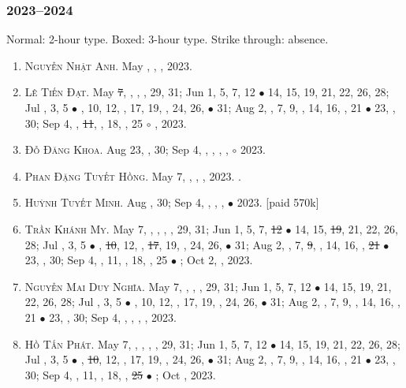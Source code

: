 \documentclass{article}
\begin{document}
\subsubsection{2023--2024}
Normal: 2-hour type. Boxed: 3-hour type. Strike through: absence.
\begin{enumerate}
	\item \textsc{Nguyễn Nhật Anh.} {\sf[In]} May , , , 2023. {\sf[Out]}
	\item \textsc{Lê Tiến Đạt.} May \st{7}, , , , 29, 31; Jun 1, 5, 7, 12 $\bullet$ 14, 15, 19, 21, 22, 26, 28; Jul , 3, 5 $\bullet$ , 10, 12, , 17, 19, , 24, 26,  $\bullet$ 31; Aug 2, , 7, 9, , 14, 16, , 21 $\bullet$ 23, , 30; Sep 4, , \st{11}, , 18, , 25 $\circ$ , 2023. {\sf[Out]}
	\item \textsc{Đỗ Đăng Khoa.} {\sf[In]} Aug 23, , 30; Sep 4, , , , , $\circ$ 2023.
	\item \textsc{Phan Đặng Tuyết Hồng.} May 7, , , , 2023. {}. {\sf[Out]}
	\item \textsc{Huỳnh Tuyết Minh.} {\sf[In]} Aug , 30; Sep 4, , , ,  $\bullet$ 2023. [paid 570k]
	\item \textsc{Trần Khánh My.} May 7, , , , , 29, 31; Jun 1, 5, 7, \st{12} $\bullet$ 14, 15, \st{19}, 21, 22, 26, 28; Jul , 3, 5 $\bullet$ , \st{10}, 12, , \st{17}, 19, , 24, 26,  $\bullet$ 31; Aug 2, , 7, \st{9}, , 14, 16, , \st{21} $\bullet$ 23, , 30; Sep 4, , 11, , 18, , 25 $\bullet$ ; Oct 2, , 2023.
	\item \textsc{Nguyễn Mai Duy Nghĩa.} May 7, , , , 29, 31; Jun 1, 5, 7, 12 $\bullet$ 14, 15, 19, 21, 22, 26, 28; Jul , 3, 5 $\bullet$ , 10, 12, , 17, 19, , 24, 26,  $\bullet$ 31; Aug 2, , 7, 9, , 14, 16, , 21 $\bullet$ 23, , 30; Sep 4, , , , , 2023.
	\item \textsc{Hồ Tấn Phát.} May 7, , , , , 29, 31; Jun 1, 5, 7, 12 $\bullet$ 14, 15, 19, 21, 22, 26, 28; Jul , 3, 5 $\bullet$ , \st{10}, 12, , 17, 19, , 24, 26,  $\bullet$ 31; Aug 2, , 7, 9, , 14, 16, , 21 $\bullet$ 23, , 30; Sep 4, , 11, , 18, , \st{25} $\bullet$ ; Oct , 2023.

\end{enumerate}
\end{document}
